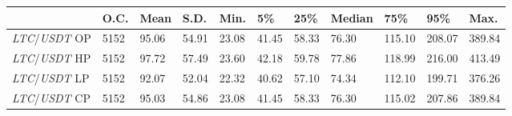 \begin{tabular}{lllllllllll}
\toprule
 & \textbf{O.C.} & \textbf{Mean} & \textbf{S.D.} & \textbf{Min.} & \textbf{5\%} & \textbf{25\%} & \textbf{Median} & \textbf{75\%} & \textbf{95\%} & \textbf{Max.} \\
\midrule
\emph{LTC}/\emph{USDT} OP & 5152 & 95.06 & 54.91 & 23.08 & 41.45 & 58.33 & 76.30 & 115.10 & 208.07 & 389.84 \\
\emph{LTC}/\emph{USDT} HP & 5152 & 97.72 & 57.49 & 23.60 & 42.18 & 59.78 & 77.86 & 118.99 & 216.00 & 413.49 \\
\emph{LTC}/\emph{USDT} LP & 5152 & 92.07 & 52.04 & 22.32 & 40.62 & 57.10 & 74.34 & 112.10 & 199.71 & 376.26 \\
\emph{LTC}/\emph{USDT} CP & 5152 & 95.03 & 54.86 & 23.08 & 41.45 & 58.33 & 76.30 & 115.02 & 207.86 & 389.84 \\
\bottomrule
\end{tabular}
